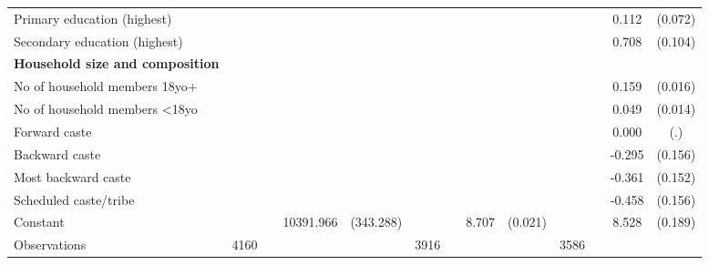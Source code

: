 {\begin{tabular}{l*{3}{cccc}}
Primary education (highest)&            &            &                     &            &            &            &                     &            &            &            &       0.112         &     (0.072)\\
Secondary education (highest)&            &            &                     &            &            &            &                     &            &            &            &       0.708\sym{***}&     (0.104)\\
\textbf{Household size and composition}&            &            &                     &            &            &            &                     &            &            &            &                     &            \\
No of household members 18yo+&            &            &                     &            &            &            &                     &            &            &            &       0.159\sym{***}&     (0.016)\\
No of household members \textless{}18yo&            &            &                     &            &            &            &                     &            &            &            &       0.049\sym{***}&     (0.014)\\
Forward caste       &            &            &                     &            &            &            &                     &            &            &            &       0.000         &         (.)\\
Backward caste      &            &            &                     &            &            &            &                     &            &            &            &      -0.295\sym{*}  &     (0.156)\\
Most backward caste &            &            &                     &            &            &            &                     &            &            &            &      -0.361\sym{**} &     (0.152)\\
Scheduled caste/tribe&            &            &                     &            &            &            &                     &            &            &            &      -0.458\sym{***}&     (0.156)\\
Constant            &            &            &   10391.966\sym{***}&   (343.288)&            &            &       8.707\sym{***}&     (0.021)&            &            &       8.528\sym{***}&     (0.189)\\
\hline
Observations        &        4160&            &                     &            &        3916&            &                     &            &        3586&            &                     &            \\
\hline\hline
\end{tabular}
}
